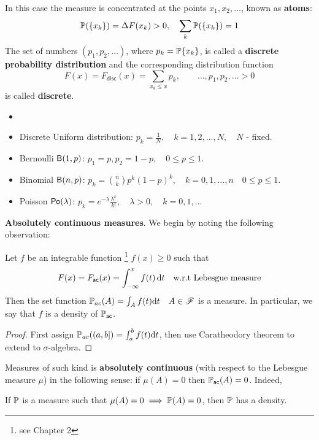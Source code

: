 In this case the measure is concentrated at the points $x_1, x_2, \dots$, known as \textbf{atoms}:
\begin{equation*}
    \mathbb{P}(\{ x_k \}) = \Delta F(x_k)>0, \quad \sum_k \mathbb{P}(\{x_k \}) = 1
\end{equation*}
The set of numbers $(p_1, p_2, \dots)$, where $p_k = \mathbb{P}\{x_k\}$, is called a \textbf{discrete probability distribution} and the corresponding distribution function 
\begin{equation*}
    F(x) = F_{\mathsf{disc}}(x) = \sum_{x_k \le x}p_k, \quad \quad \dots, p_1, p_2, \dots >0
\end{equation*}
is called \textbf{discrete}.
\begin{example}
\begin{itemize}
    \item[]
    \item Discrete Uniform distribution: $p_k = \frac{1}{N}, \quad k = 1,2,\dots, N, \quad N$ - fixed.
    \item Bernoulli $\mathsf{B}(1,p)$: $p_1 = p, p_2 = 1-p,\quad 0 \le p \le 1.$
    \item Binomial $\mathsf{B}(n,p)$: $p_k = \binom{n}{k} p^k (1-p)^k,\quad k = 0,1,\dots,n \quad 0 \le p \le 1.$
    \item Poisson $\mathsf{Po}(\lambda)$: $p_k = e^{-\lambda}\frac{\lambda^k}{k!}, \quad \lambda>0,\quad k = 0,1,\dots$
\end{itemize}
\end{example}
\textbf{Absolutely continuous measures}. We begin by noting the following observation:
\begin{proposition}
Let $f$ be an integrable function \footnote{see Chapter 2} $f(x) \ge 0$ such that
\begin{equation*}
    F(x) = F_{\mathsf{ac}}(x) = \int_{-\infty}^x f(t) \, \mathrm{d} t \quad \text{w.r.t Lebesgue measure}
\end{equation*}
Then the set function $\mathbb{P}_{ac}(A) = \int_{A} f(t)\mathrm{d} t \quad A \in \mathcal{F}$ is a measure. In particular, we say that $f$ is a density of $\mathbb{P}_{\mathsf{ac}}$.
\end{proposition}
\begin{proof}
First assign $\mathbb{P}_{ac}((a,b]) = \int_a^bf(t)\mathrm{d} t$, then use Caratheodory theorem to extend to $\sigma$-algebra.
\end{proof}
Measures of such kind is \textbf{absolutely continuous} (with respect to the Lebesgue measure $\mu$) in the following sense: if $\mu(A) = 0$ then $\mathbb{P}_{\mathsf{ac}}(A) = 0$. Indeed,

\begin{theorem} If $\mathbb{P}$ is a measure such that $\mu(A) = 0\implies \mathbb{P}(A) = 0$, then $\mathbb{P}$ has a density.
\end{theorem}

